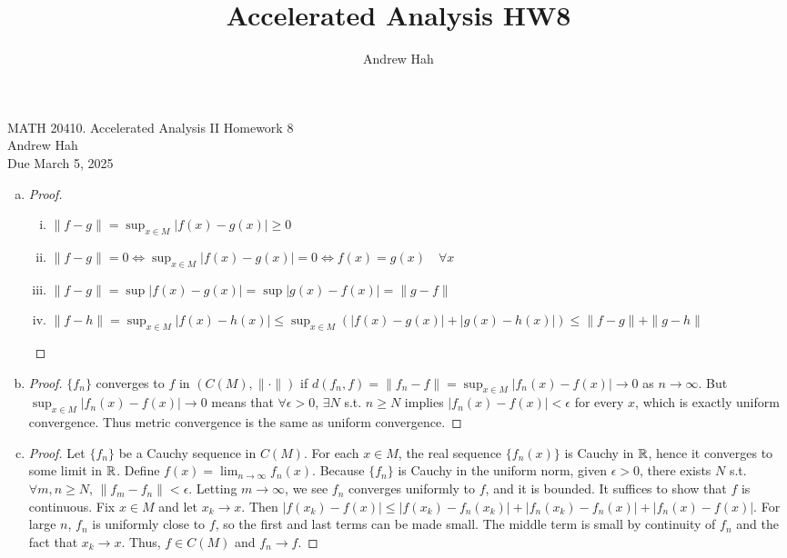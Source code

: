 \documentclass[11pt]{article}
\title{Accelerated Analysis HW8}
\author{Andrew Hah}
\begin{document}
\pagestyle{plain}
\begin{center}
{\Large MATH 20410. Accelerated Analysis II Homework 8} \\ 
\vspace{.2in}  
Andrew Hah \\
Due March 5, 2025
\end{center}

\begin{exercise}{1}
    \begin{enumerate} [(a)]
        \item \begin{proof}
            \begin{enumerate} [(i)]
                \item $\| f - g \| = \sup_{x \in M} |f(x) - g(x)| \ge 0$
                \item $\| f - g \| = 0 \iff \sup_{x \in M} |f(x) - g(x)| = 0 \iff f(x) = g(x) \quad \forall x$
                \item $\| f - g \| = \sup |f(x) - g(x)| = \sup |g(x) - f(x)| = \| g - f\|$
                \item $\| f - h \| = \sup_{x \in M} |f(x) - h(x)| \le \sup_{x \in M} (|f(x) - g(x)| + |g(x) - h(x)|) \le \| f - g\| + \| g - h \|$
            \end{enumerate}
        \end{proof}
        \item \begin{proof}
            $\{ f_n \}$ converges to $f$ in $(C(M), \| \cdot \|)$ if $d(f_n, f) = \| f_n - f\| = \sup_{x \in M} |f_n(x) - f(x)| \to 0$ as $ n \to \infty$. But $\sup_{x \in M} |f_n(x) - f(x)| \to 0$ means that  $\forall \epsilon > 0$, $\exists N$ s.t. $n \ge N$ implies $|f_n(x) - f(x)| < \epsilon$ for every $x$, which is exactly uniform convergence. Thus metric convergence is the same as uniform convergence. 
        \end{proof}
        \item \begin{proof}
            Let $\{ f_n \}$ be a Cauchy sequence in $C(M)$. For each $x \in M$, the real sequence $\{ f_n (x) \}$ is Cauchy in $\mathbb{R}$, hence it converges to some limit in $\mathbb{R}$. Define $f(x) = \lim_{n \to \infty} f_n(x)$. Because $\{ f_n \}$ is Cauchy in the uniform norm, given $\epsilon > 0$, there exists $N$ s.t. $\forall m, n \ge N$, $\| f_m - f_n \| < \epsilon$. Letting $m \to \infty$, we see $f_n$ converges uniformly to $f$, and it is bounded. It suffices to show that $f$ is continuous. Fix $x \in M$ and let $x_k \to x$. Then $|f(x_k) - f(x)| \le |f(x_k) - f_n(x_k)| + |f_n(x_k) - f_n(x)| + |f_n(x) - f(x)|$. For large $n$, $f_n$ is uniformly close to $f$, so the first and last terms can be made small. The middle term is small by continuity of $f_n$ and the fact that $x_k \to x$. Thus, $f \in C(M)$ and $f_n \to f$. 
        \end{proof}
    \end{enumerate}
\end{exercise}
\end{document}
